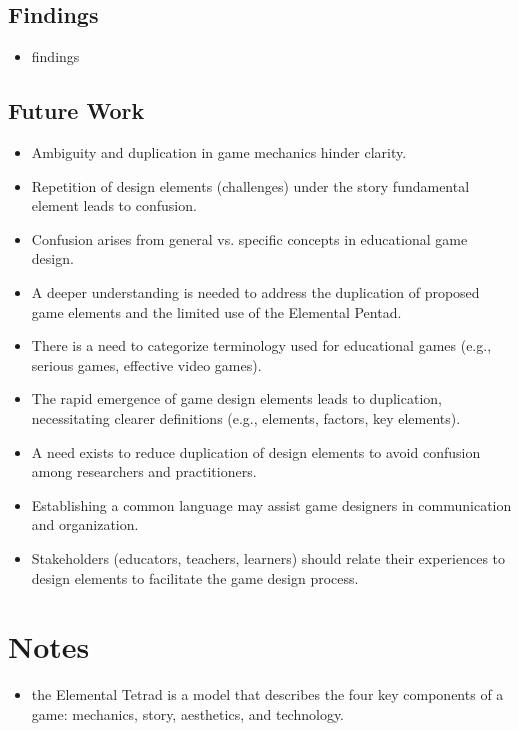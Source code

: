 \subsection{Findings}
\begin{itemize}
    \item findings
\end{itemize}


\subsection{Future Work}
\begin{itemize}
    \item Ambiguity and duplication in game mechanics hinder clarity.
    \item Repetition of design elements (challenges) under the story fundamental element leads to confusion.
    \item Confusion arises from general vs. specific concepts in educational game design.
    \item A deeper understanding is needed to address the duplication of proposed game elements and the limited use of the Elemental Pentad.
    \item There is a need to categorize terminology used for educational games (e.g., serious games, effective video games).
    \item The rapid emergence of game design elements leads to duplication, necessitating clearer definitions (e.g., elements, factors, key elements).
    \item A need exists to reduce duplication of design elements to avoid confusion among researchers and practitioners.
    \item Establishing a common language may assist game designers in communication and organization.
    \item Stakeholders (educators, teachers, learners) should relate their experiences to design elements to facilitate the game design process.
\end{itemize}
    

\section{Notes}
\begin{itemize}
\item the Elemental Tetrad is a model that describes the four key components of a game: mechanics, story, aesthetics, and technology.

\end{itemize}
